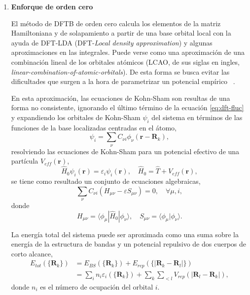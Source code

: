 \begin{enumerate}
    \item \textbf{Enforque de orden cero}

        El método de DFTB de orden cero calcula los elementos de la matriz 
        Hamiltoniana y de solapamiento a partir de una base orbital local con la
        ayuda de DFT-LDA (DFT-\textit{Local density approximation}) y algunas
        aproximaciones en las integrales. Puede verse como una aproximación de 
        una combinación lineal de los orbitales atómicos (LCAO, de sus siglas en 
        ingles, \textit{linear-combination-of-atomic-orbitals}). De esta forma se
        busca evitar las dificultades que surgen a la hora de parametrizar un 
        potencial empírico ~\cite{dftb1, dftb2}.

        En esta aproximación, las ecuaciones de Kohn-Sham son resultas de una
        forma no consistente, ignorando el último término de la ecuación 
        \ref{eq:dft-fluc} y expandiendo los orbitales de Kohn-Sham $\psi_i$ del 
        sistema en términos de las funciones de la base localizadas centradas en 
        el átomo,
        \begin{equation*}
        \psi_i = \sum_{\nu} C_{\nu i} \phi_{\nu}(\mathbf{r}-\mathbf{R}_k),
        \end{equation*}
        resolviendo las ecuaciones de Kohn-Sham para un potencial efectivo de una
        partícula $V_{eff}(\mathbf{r})$,
        \begin{equation}\label{eq:kohn-sham-mod}
            \hat{H}_0 \psi_i(\mathbf{r}) = \varepsilon_i \psi_i(\mathbf{r}), \quad \hat{H}_0 = \hat{T} + V_{eff}(\mathbf{r}),
        \end{equation}
        se tiene como resultado un conjunto de ecuaciones algebraicas,
        \begin{equation}\label{eq:alg-eq}
        \sum_{\nu} C_{\nu i} (H_{\mu \nu} - \varepsilon S_{\mu \nu}) = 0, \quad \forall \mu, i,
        \end{equation}
        donde
        \begin{equation*}
        H_{\mu \nu} = \langle \phi_{\mu}|\hat{H}_0|\phi_{\nu} \rangle, \quad S_{\mu \nu} = \langle\phi_{\mu}|\phi_{\nu}\rangle.
        \end{equation*}

        La energía total del sistema puede ser aproximada como una suma sobre la
        energía de la estructura de bandas y un potencial repulsivo de dos cuerpos
        de corto alcance,
        \begin{equation*}
            \begin{aligned}
                   E_{tot}(\{\mathbf{R}_k\}) &= E_{BS}(\{\mathbf{R}_k\}) + E_{rep}(\{|\mathbf{R}_k - \mathbf{R}_l|\}) \\
                    &= \sum_i n_i \varepsilon_i(\{\mathbf{R}_k\}) + \sum_k \sum_{<l} V_{rep}(|\mathbf{R}_l - \mathbf{R}_k|),
            \end{aligned}
        \end{equation*}
        donde $n_i$ es el número de ocupación del orbital $i$.
        

\end{enumerate}
